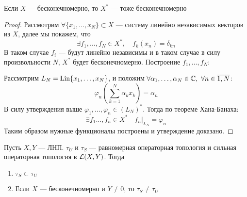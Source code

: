 \newpage

\begin{claim}
	Если $X$ --- бесконечномерно, то $X^*$ --- тоже бесконечномерно
\end{claim}
\begin{proof}
	Рассмотрим $\forall \{x_1, \dots, x_N\} \subset X$ --- систему линейно независимых векторов из $X$, далее мы покажем, что 
	$$
	\exists f_1, \dots, f_N \in X^*, \quad f_k(x_n) = \delta_{kn}
	$$
	В таком случае $f_i$ --- будут линейно независимы и в таком случае в силу произвольности $N$, $X^*$ будет бесконечномерно.
	Построение $f_1, \dots, f_N$: 
	
	Рассмотрим $L_N = \operatorname{Lin}\{x_1, \dots, x_N\}$, и положим $\forall \alpha_1, \dots, \alpha_N \in \mathbb{C}, \ \forall n \in \overline{1, N}$:
	$$
	\varphi_n\left(\sum_{k=1}^{N}\alpha_k x_k\right) = \alpha_n
	$$
	В силу утверждения выше $\varphi_1, \dots, \varphi_n \in (L_N)^*$. Тогда по теореме Хана-Банаха: 
	$$
	\exists f_1 \dots, f_n \in X^* \quad f_n|_{L_N} = \varphi_n
	$$
	Таким образом нужные функционалы построены и утверждение доказано.
\end{proof}
\begin{claim}
	Пусть $X,Y$ --- ЛНП. $\tau_U$ и $\tau_S$ --- равномерная операторная топология и сильная операторная топология в $\mathcal{L}(X, Y)$. Тогда
	\begin{enumerate}
		\item $\tau_S \subset \tau_U$
		\item Если $X$ --- бесконечномерно и $Y \neq 0$, то $\tau_S \neq \tau_U$
	\end{enumerate}
\end{claim}
